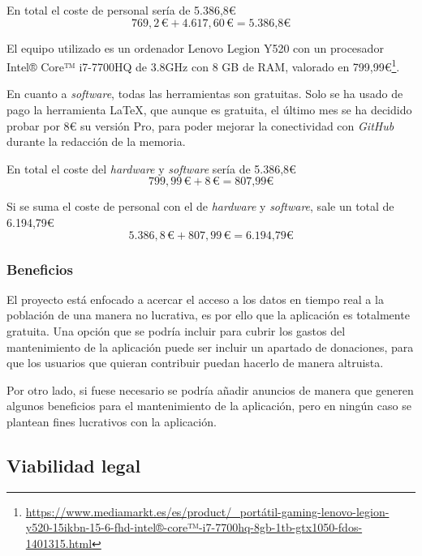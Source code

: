 En total el coste de personal sería de 5.386,8€
$$769,2 \, \text{€} + 4.617,60 \, \text{€} = \text{5.386,8€}$$

El equipo utilizado es un ordenador Lenovo Legion Y520 con un procesador Intel® Core™ i7-7700HQ de 3.8GHz con 8 GB de RAM, valorado en 799,99€\footnote{\url{https://www.mediamarkt.es/es/product/_portátil-gaming-lenovo-legion-y520-15ikbn-15-6-fhd-intel®-core™-i7-7700hq-8gb-1tb-gtx1050-fdos-1401315.html}}.

En cuanto a \textit{software}, todas las herramientas son gratuitas. Solo se ha usado de pago la herramienta \LaTeX{}, que aunque es gratuita, el último mes se ha decidido probar por 8€ su versión Pro, para poder mejorar la conectividad con \textit{GitHub} durante la redacción de la memoria.

En total el coste del \textit{hardware} y \textit{software} sería de 5.386,8€
$$799,99 \, \text{€} + 8 \, \text{€} = \text{807,99€}$$

Si se suma el coste de personal con el de \textit{hardware} y \textit{software}, sale un total de 6.194,79€
$$5.386,8 \, \text{€} + 807,99 \, \text{€} = \text{6.194,79€}$$

\subsubsection{Beneficios}

El proyecto está enfocado a acercar el acceso a los datos en tiempo real a la población de una manera no lucrativa, es por ello que la aplicación es totalmente gratuita.
Una opción que se podría incluir para cubrir los gastos del mantenimiento de la aplicación puede ser incluir un apartado de donaciones, para que los usuarios que quieran contribuir puedan hacerlo de manera altruista.

Por otro lado, si fuese necesario se podría añadir anuncios de manera que generen algunos beneficios para el mantenimiento de la aplicación, pero en ningún caso se plantean fines lucrativos con la aplicación.

\subsection{Viabilidad legal}

